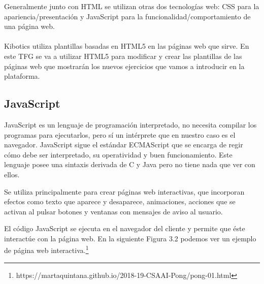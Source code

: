 Generalmente junto con HTML se utilizan otras dos tecnologías web: CSS para la apariencia/presentación y JavaScript para la funcionalidad/comportamiento de una página web.
\\
\\
Kibotics utiliza plantillas basadas en HTML5 en las páginas web que sirve. En este TFG se va a utilizar HTML5 para modificar y crear las plantillas de las páginas web que mostrarán los nuevos ejercicios que vamos a introducir en la plataforma.

\subsection{JavaScript}
JavaScript es un lenguaje de programación interpretado, no necesita compilar los programas para ejecutarlos, pero sí un intérprete que en nuestro caso es el navegador. JavaScript sigue el estándar ECMAScript que se encarga de regir cómo debe ser interpretado, su operatividad y buen funcionamiento. Este lenguaje posee una sintaxis derivada de C y Java pero no tiene nada que ver con ellos.

Se utiliza principalmente para crear páginas web interactivas, que incorporan efectos como texto que aparece y
desaparece, animaciones, acciones que se activan al pulsar botones y ventanas con
mensajes de aviso al usuario\cite{javascript}.

El código JavaScript se ejecuta en el navegador del cliente y permite que éste interactúe con la página web. En la siguiente Figura 3.2 podemos ver un ejemplo de página web interactiva.\footnote{https://martaquintana.github.io/2018-19-CSAAI-Pong/pong-01.html}

